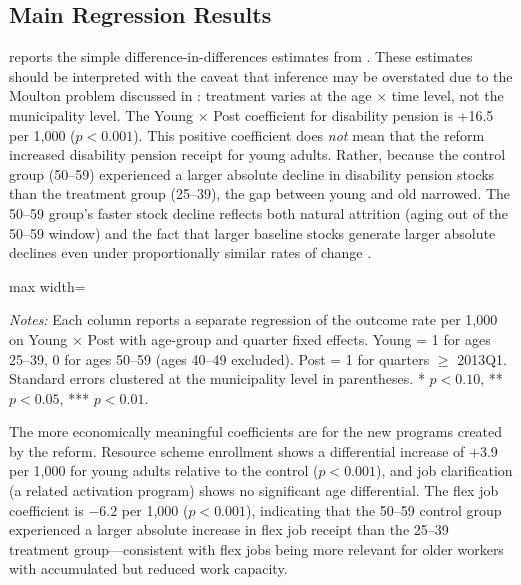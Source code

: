\documentclass[12pt]{article}
\begin{document}
\subsection{Main Regression Results}

 reports the simple difference-in-differences estimates from . These estimates should be interpreted with the caveat that inference may be overstated due to the Moulton problem discussed in : treatment varies at the age $\times$ time level, not the municipality level. The Young $\times$ Post coefficient for disability pension is +16.5 per 1,000 ($p < 0.001$). This positive coefficient does \textit{not} mean that the reform increased disability pension receipt for young adults. Rather, because the control group (50--59) experienced a larger absolute decline in disability pension stocks than the treatment group (25--39), the gap between young and old narrowed. The 50--59 group's faster stock decline reflects both natural attrition (aging out of the 50--59 window) and the fact that larger baseline stocks generate larger absolute declines even under proportionally similar rates of change \citep{roth2022pretest}.

\begin{table}[H]
\centering
\caption{Main Difference-in-Differences Results}
\label{tab:did_main}
\begin{adjustbox}{max width=\textwidth}

\end{adjustbox}
\par\vspace{0.3em}
{\small \textit{Notes:} Each column reports a separate regression of the outcome rate per 1,000 on Young $\times$ Post with age-group and quarter fixed effects. Young = 1 for ages 25--39, 0 for ages 50--59 (ages 40--49 excluded). Post = 1 for quarters $\geq$ 2013Q1. Standard errors clustered at the municipality level in parentheses. * $p<0.10$, ** $p<0.05$, *** $p<0.01$.}
\end{table}

The more economically meaningful coefficients are for the new programs created by the reform. Resource scheme enrollment shows a differential increase of +3.9 per 1,000 for young adults relative to the control ($p < 0.001$), and job clarification (a related activation program) shows no significant age differential. The flex job coefficient is $-6.2$ per 1,000 ($p < 0.001$), indicating that the 50--59 control group experienced a larger absolute increase in flex job receipt than the 25--39 treatment group---consistent with flex jobs being more relevant for older workers with accumulated but reduced work capacity.
\end{document}
